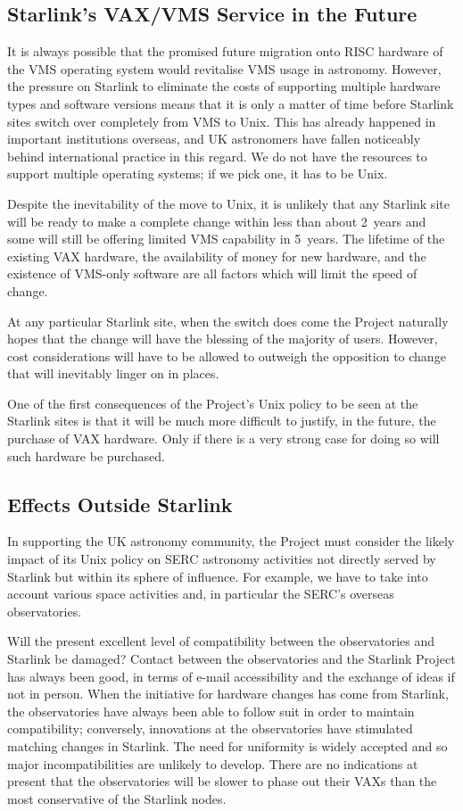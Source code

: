 \subsection{Starlink's VAX/VMS Service in the Future}
It is always possible that the promised future migration onto RISC
hardware of the VMS operating system would revitalise VMS usage in
astronomy.  However, the pressure on Starlink to eliminate the costs of
supporting multiple hardware types and software versions means that it
is only a matter of time before Starlink sites switch over completely
from VMS to Unix.  This has already happened in important institutions
overseas, and UK astronomers have fallen noticeably behind international
practice in this regard.  We do not have the resources to support
multiple operating systems;  if we pick one, it has to be Unix.

Despite the inevitability of the move to Unix, it is unlikely that any
Starlink site will be ready to make a complete change within less than
about 2~years and some will still be offering limited VMS capability in
5~years.  The lifetime of the existing VAX hardware, the availability of
money for new hardware, and the existence of VMS-only software are all
factors which will limit the speed of change.

At any particular Starlink site, when the switch does come the Project
naturally hopes that the change will have the blessing of the majority
of users.  However, cost considerations will have to be allowed to
outweigh the opposition to change that will inevitably linger on in
places.

One of the first consequences of the Project's Unix policy to be seen at
the Starlink sites is that it will be much more difficult to justify, in
the future, the purchase of VAX hardware.  Only if there is a very
strong case for doing so will such hardware be purchased.

\subsection{Effects Outside Starlink}
In supporting the UK astronomy community, the Project must consider the
likely impact of its Unix policy on SERC astronomy activities not
directly served by Starlink but within its sphere of influence.
For example, we have to take into account various space activities
and, in particular the SERC's overseas observatories.

Will the present excellent level of compatibility between the
observatories and Starlink be damaged?
Contact between the observatories and the Starlink Project has always
been good, in terms of e-mail accessibility and the exchange of ideas
if not in person.  When the initiative for hardware changes has come
from Starlink, the observatories have always been able to follow suit
in order to maintain compatibility;  conversely, innovations at the
observatories have stimulated matching changes in Starlink.  The need
for uniformity is widely accepted and so major incompatibilities are
unlikely to develop.  There are no indications at present that the
observatories will be slower to phase out their VAXs than the most
conservative of the Starlink nodes.

